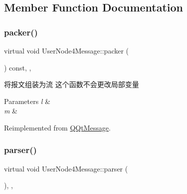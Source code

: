 \subsection{Member Function Documentation}
\mbox{\label{class_user_node4_message_a2ed30883418df021917a62ff1b27c269}} 
\subsubsection{\texorpdfstring{packer()}{packer()}}
{\footnotesize\ttfamily virtual void User\+Node4\+Message\+::packer (\begin{DoxyParamCaption}\item[{Q\+Byte\+Array \&}]{ }\end{DoxyParamCaption}) const\hspace{0.3cm}{\ttfamily [inline]}, {\ttfamily [override]}, {\ttfamily [virtual]}}



将报文组装为流 这个函数不会更改局部变量 


\begin{DoxyParams}{Parameters}
{\em l} & \\
\hline
{\em m} & \\
\hline
\end{DoxyParams}


Reimplemented from \mbox{\hyperlink{class_q_qt_message_af1885c2c3628495808dca66ee8d72e14}{Q\+Qt\+Message}}.

\mbox{\label{class_user_node4_message_a758152d93aebcd76949f1fb47ea9cdd5}} 
\subsubsection{\texorpdfstring{parser()}{parser()}}
{\footnotesize\ttfamily virtual void User\+Node4\+Message\+::parser (\begin{DoxyParamCaption}\item[{const Q\+Byte\+Array \&}]{ }\end{DoxyParamCaption})\hspace{0.3cm}{\ttfamily [inline]}, {\ttfamily [override]}, {\ttfamily [virtual]}}



